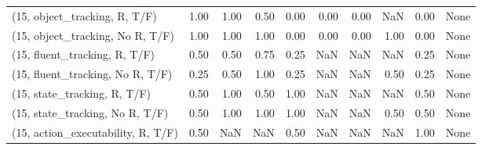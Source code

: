 \begin{table*}[h!]
\begin{adjustbox}{width=2\columnwidth,center}
\begin{tabular}{lrrr|rrr|rrr}
\midrule
(15, object\_tracking, R, T/F)         &                      1.00 &                  1.00 &                      0.50 &                          0.00 &                      0.00 &                          0.00 &                                    NaN &                               0.00 &                                  None \\
(15, object\_tracking, No R, T/F)      &                      1.00 &                  1.00 &                      1.00 &                          0.00 &                      0.00 &                          0.00 &                                   1.00 &                               0.00 &                                  None \\
(15, fluent\_tracking, R, T/F)         &                      0.50 &                  0.50 &                      0.75 &                          0.25 &                       NaN &                           NaN &                                    NaN &                               0.25 &                                  None \\
(15, fluent\_tracking, No R, T/F)      &                      0.25 &                  0.50 &                      1.00 &                          0.25 &                       NaN &                           NaN &                                   0.50 &                               0.25 &                                  None \\
(15, state\_tracking, R, T/F)          &                      0.50 &                  1.00 &                      0.50 &                          1.00 &                       NaN &                           NaN &                                    NaN &                               0.50 &                                  None \\
(15, state\_tracking, No R, T/F)       &                      0.50 &                  1.00 &                      1.00 &                          1.00 &                       NaN &                           NaN &                                   0.50 &                               0.50 &                                  None \\
(15, action\_executability, R, T/F)    &                      0.50 &                   NaN &                       NaN &                          0.50 &                       NaN &                           NaN &                                    NaN &                               1.00 &                                  None \\

\end{tabular}
\end{adjustbox}
\end{table*}

